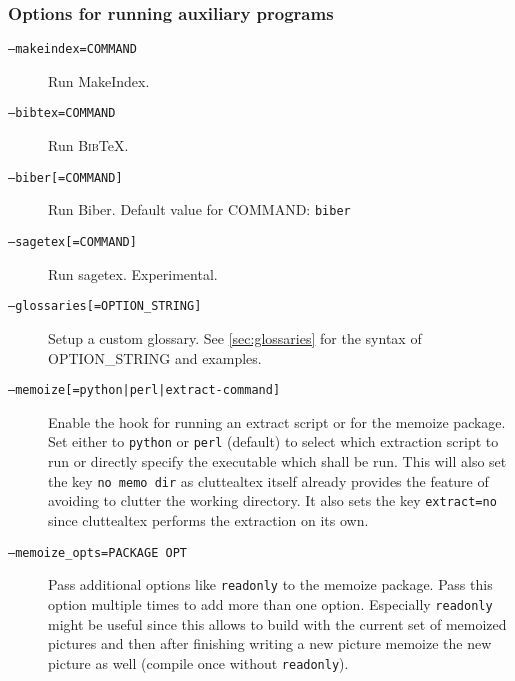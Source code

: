 \documentclass[a4paper, 11pt]{scrartcl}
\providecommand\BibTeX{\textsc{Bib}\TeX\xspace}
\newcommand\metavar[1]{\textnormal{\textsf{#1}}}
\begin{document}
\subsubsection{Options for running auxiliary programs}
\begin{description}
\item[\texttt{--makeindex=\metavar{COMMAND}}]
  Run MakeIndex.
\item[\texttt{--bibtex=\metavar{COMMAND}}]
  Run \BibTeX.
\item[\texttt{--biber[=\metavar{COMMAND}]}]
  Run Biber. Default value for \metavar{COMMAND}: \texttt{biber}
\item[\texttt{--sagetex[=\metavar{COMMAND}]}]
  Run sagetex. Experimental.
\item[\texttt{--glossaries[=\metavar{OPTION\_STRING}]}]
  Setup a custom glossary. See \autoref{sec:glossaries} for the syntax of \metavar{OPTION\_STRING} and examples.
\item[\texttt{--memoize[=\metavar{python|perl|extract-command}]}]
  Enable the hook for running an extract script or for the memoize package. Set
  either to \texttt{python} or \texttt{perl} (default) to select which
  extraction script to run or directly specify the executable which shall be
  run. This will also set the key \texttt{no memo dir} as cluttealtex itself
  already provides the feature of avoiding to clutter the working directory. It
  also sets the key \texttt{extract=no} since cluttealtex performs the
  extraction on its own.
\item[\texttt{--memoize\_opts=\metavar{PACKAGE OPT}}]
  Pass additional options like \texttt{readonly} to the memoize package. Pass
  this option multiple times to add more than one option.
  Especially \texttt{readonly} might be useful since this allows to build with
  the current set of memoized pictures and then after finishing writing a new
  picture memoize the new picture as well (compile once without
  \texttt{readonly}).
\end{description}
\end{document}
